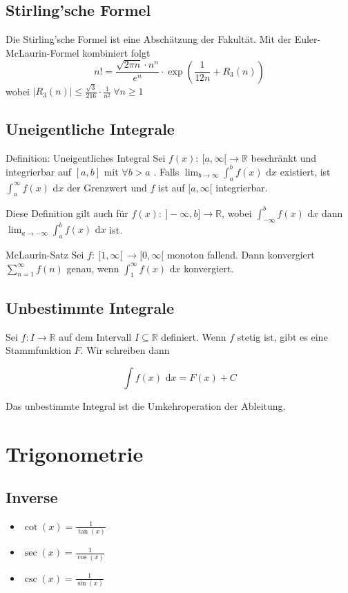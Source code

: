 \documentclass[a4paper,10pt]{article}
\def\R{\mathbb{R}}
\def\dx{\text{ d}x}
\begin{document}
\subsection{Stirling'sche Formel}
Die Stirling'sche Formel ist eine Abschätzung der Fakultät. Mit der Euler-McLaurin-Formel kombiniert folgt
$$n! = \frac{\sqrt{2\pi n} \cdot n^n}{e^n} \cdot \exp(\frac{1}{12n}+R_3(n))$$
wobei $|R_3(n)| \le \frac{\sqrt{3}}{216}\cdot\frac{1}{n^2} \ \forall n \ge 1$

\subsection{Uneigentliche Integrale}
\begin{subbox}{Definition: Uneigentliches Integral}
 Sei $f(x): \ [ a,\infty [ \to \R$ beschränkt und integrierbar auf $[a,b] $ mit $\forall b > a$ . Falls $\lim_{b\to\infty} \int_a^b f(x) \dx$ existiert, ist $\int_a^\infty f(x) \dx$ der Grenzwert und $f$ ist auf $[a, \infty[$ integrierbar.
\end{subbox}
Diese Definition gilt auch für $f(x) : \ ]-\infty,b] \to \R$, wobei $\int_{-\infty}^b f(x) \dx $ dann $ \lim_{a\to-\infty} \int_a^b f(x) \dx$ ist.
\begin{subbox}{McLaurin-Satz}
Sei $f: \ [1, \infty[ \ \to [0, \infty[$ monoton fallend. Dann konvergiert $\sum_{n=1}^\infty f(n)$ genau, wenn $\int_1^\infty f(x) \dx$ konvergiert.
\end{subbox}

\subsection{Unbestimmte Integrale}
Sei $f: I \to \R$ auf dem Intervall $I \subseteq \R$ definiert. Wenn $f$ stetig ist, gibt es eine Stammfunktion $F$. Wir schreiben dann

$$\int f(x) \dx = F(x) + C$$

Das unbestimmte Integral ist die Umkehroperation der Ableitung.

\section{Trigonometrie}

\subsection{Inverse}
\begin{itemize}
  \item $\cot(x) = \frac{1}{\tan(x)}$
  \item $\sec(x) = \frac{1}{\cos(x)}$
  \item $\csc(x) = \frac{1}{\sin(x)}$
\end{itemize}
\end{document}

